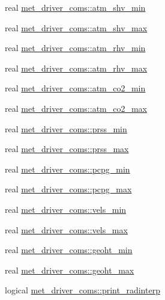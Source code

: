 \begin{DoxyCompactItemize}
\item 
real \hyperlink{namespacemet__driver__coms_a013a5b6c2883c734ae9c54853b87d061}{met\+\_\+driver\+\_\+coms\+::atm\+\_\+shv\+\_\+min}
\item 
real \hyperlink{namespacemet__driver__coms_af5f857e4fab7c7d10c849dfce549c5bb}{met\+\_\+driver\+\_\+coms\+::atm\+\_\+shv\+\_\+max}
\item 
real \hyperlink{namespacemet__driver__coms_a0a0fdcc78995f5627a278a0ad970279b}{met\+\_\+driver\+\_\+coms\+::atm\+\_\+rhv\+\_\+min}
\item 
real \hyperlink{namespacemet__driver__coms_a2e9657af0efaad7d0e12e6a42cc8df71}{met\+\_\+driver\+\_\+coms\+::atm\+\_\+rhv\+\_\+max}
\item 
real \hyperlink{namespacemet__driver__coms_ae3e4146e8ca9281e8ba30db39ece0e43}{met\+\_\+driver\+\_\+coms\+::atm\+\_\+co2\+\_\+min}
\item 
real \hyperlink{namespacemet__driver__coms_aec2e25a82647949db4d9bbaafb62220c}{met\+\_\+driver\+\_\+coms\+::atm\+\_\+co2\+\_\+max}
\item 
real \hyperlink{namespacemet__driver__coms_a2ce8ae5dcf47b145fe6e4e73111f583a}{met\+\_\+driver\+\_\+coms\+::prss\+\_\+min}
\item 
real \hyperlink{namespacemet__driver__coms_ad1eb689e5f4208a3cb8c1565220b7f2f}{met\+\_\+driver\+\_\+coms\+::prss\+\_\+max}
\item 
real \hyperlink{namespacemet__driver__coms_ad1841d1a071652e80742e648d0eed3e8}{met\+\_\+driver\+\_\+coms\+::pcpg\+\_\+min}
\item 
real \hyperlink{namespacemet__driver__coms_adb27c5034caa99a0fcc4d3b42ef1d2e3}{met\+\_\+driver\+\_\+coms\+::pcpg\+\_\+max}
\item 
real \hyperlink{namespacemet__driver__coms_ac3d38fa5850b9e27104cf9949d2b5c15}{met\+\_\+driver\+\_\+coms\+::vels\+\_\+min}
\item 
real \hyperlink{namespacemet__driver__coms_a95bff007e6bff6167b2a89758d76fc2e}{met\+\_\+driver\+\_\+coms\+::vels\+\_\+max}
\item 
real \hyperlink{namespacemet__driver__coms_a2662a56fa4062bd473b19c649fa43b95}{met\+\_\+driver\+\_\+coms\+::geoht\+\_\+min}
\item 
real \hyperlink{namespacemet__driver__coms_aa1669f7b7ef87420b77b82855f067517}{met\+\_\+driver\+\_\+coms\+::geoht\+\_\+max}
\item 
logical \hyperlink{namespacemet__driver__coms_a12635d011e458fe5603d8af326faa956}{met\+\_\+driver\+\_\+coms\+::print\+\_\+radinterp}
\item 

\end{DoxyCompactItemize}
